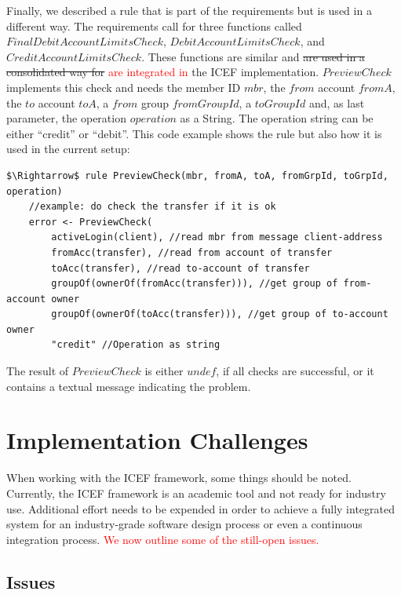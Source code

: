 Finally, we described a rule that is part of the requirements but is used in a different way. The requirements call for three functions called $FinalDebitAccountLimitsCheck$, $DebitAccountLimitsCheck$, and $CreditAccountLimitsCheck$. These functions are similar and \st{are used in a consolidated way for} \textcolor{red}{are integrated in} the ICEF implementation. $PreviewCheck$ implements this check and needs the member ID $mbr$, the $from$ account $fromA$, the $to$ account $toA$, a $from$ group $fromGroupId$, a $toGroupId$ and, as last parameter, the operation $operation$ as a String. The operation string can be either ``credit'' or ``debit''. This code example shows the rule but also how it is used in the current setup:

\begin{lstlisting}[language=bsl,mathescape=true]
	$\Rightarrow$ rule PreviewCheck(mbr, fromA, toA, fromGrpId, toGrpId, operation)
	//example: do check the transfer if it is ok
	error <- PreviewCheck(
		activeLogin(client), //read mbr from message client-address
		fromAcc(transfer), //read from account of transfer
		toAcc(transfer), //read to-account of transfer
		groupOf(ownerOf(fromAcc(transfer))), //get group of from-account owner
		groupOf(ownerOf(toAcc(transfer))), //get group of to-account owner
		"credit" //Operation as string
\end{lstlisting}

The result of $PreviewCheck$ is either $undef$, if all checks are successful, or it contains a textual message indicating the problem.

\section{Implementation Challenges}
\label{sec:impl-challenges}

When working with the ICEF framework, some things should be noted. Currently, the ICEF framework is an academic tool and not ready for industry use. Additional effort needs to be expended in order to achieve a fully integrated system for an industry-grade software design process or even a continuous integration process. \textcolor{red}{We now outline some of the still-open issues.}

\subsection{Issues}

